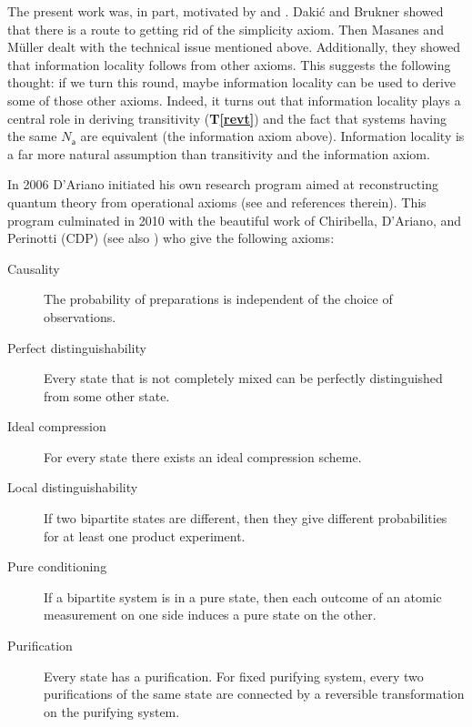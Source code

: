 \documentclass[10pt]{article}
\begin{document}
The present work was, in part, motivated by \cite{dakic2009quantum} and \cite{masanes2010derivation}.  Daki\'c and Brukner showed that there is a route to getting rid of the simplicity axiom.  Then Masanes and M\"uller dealt with the technical issue mentioned above.  Additionally, they showed that information locality follows from other axioms.  This suggests the following thought: if we turn this round,  maybe information locality can be used to derive some of those other axioms.   Indeed, it turns out that information locality plays a central role in deriving transitivity ({\bf T\ref{revt}}) and the fact that systems having the same $N_\mathsf{a}$ are equivalent (the information axiom above).  Information locality is a far more natural assumption than transitivity and the information axiom.

In 2006 D'Ariano initiated his own research program aimed at reconstructing quantum theory from operational axioms (see \cite{d2008probabilistic} and references therein).   This program culminated in 2010 with the beautiful work of Chiribella, D'Ariano, and Perinotti (CDP) \cite{chiribella2010informational} (see also \cite{chiribella2010probabilistic}) who give the following axioms:
\begin{description}
\item[Causality] The probability of preparations is independent of the choice of observations.
\item[Perfect distinguishability] Every state that is not completely mixed can be perfectly distinguished from some other state.
\item[Ideal compression] For every state there exists an ideal compression scheme.
\item[Local distinguishability] If two bipartite states are different, then they give different probabilities for at least one product experiment.
\item[Pure conditioning] If a bipartite system is in a pure state, then each outcome of an atomic measurement on one side induces a pure state on the other.
\item[Purification] Every state has a purification. For fixed purifying system, every two purifications of the same state are connected by a reversible transformation on the purifying system.
\end{description}
\end{document}

